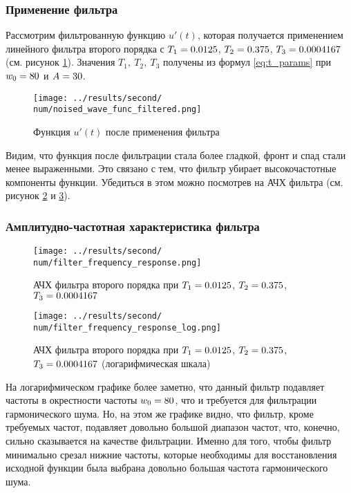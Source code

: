 \FloatBarrier
\subsubsection{Применение фильтра}

Рассмотрим фильтрованную функцию $u'(t)$, которая получается применением линейного фильтра второго порядка с $T_1 = \Tf$, $T_2 = \Ts$, $T_3 = \Tt$ (см. рисунок \ref{fig:noised_wave_func_filtered_\num}).
Значения $T_1,~T_2,~T_3$ получены из формул \eqref{eq:t_params} при $w_0 = 80$ и $A = 30$.

\begin{figure}[ht!]
    \centering
    \texttt{[image: ../results/second/\\num/noised\_wave\_func\_filtered.png]}
    \caption{Функция $u'(t)$ после применения фильтра}
    \label{fig:noised_wave_func_filtered_\num}
\end{figure}

Видим, что функция после фильтрации стала более гладкой, фронт и спад стали менее выраженными.
Это связано с тем, что фильтр убирает высокочастотные компоненты функции. Убедиться в этом можно 
посмотрев на АЧХ фильтра (см. рисунок \ref{fig:filter_frequency_response_\num} и \ref{fig:filter_frequency_response_log_\num}).

\FloatBarrier
\subsubsection{Амплитудно-частотная характеристика фильтра}
\begin{figure}[ht!]
    \centering
    \texttt{[image: ../results/second/\\num/filter\_frequency\_response.png]}
    \caption{АЧХ фильтра второго порядка при $T_1 = \Tf$, $T_2 = \Ts$, $T_3 = \Tt$}
    \label{fig:filter_frequency_response_\num}
\end{figure}

\begin{figure}[ht!]
    \centering
    \texttt{[image: ../results/second/\\num/filter\_frequency\_response\_log.png]}
    \caption{АЧХ фильтра второго порядка при $T_1 = \Tf$, $T_2 = \Ts$, $T_3 = \Tt$ (логарифмическая шкала)}
    \label{fig:filter_frequency_response_log_\num}
\end{figure}

На логарифмическом графике более заметно, что данный фильтр подавляет частоты в окрестности частоты $w_0 = 80$, что и требуется для фильтрации гармонического шума. 
Но, на этом же графике видно, что фильтр, кроме требуемых частот, подавляет довольно большой диапазон частот, что, конечно, сильно сказывается на качестве фильтрации. 
Именно для того, чтобы фильтр минимально срезал нижние частоты, которые необходимы для восстановления исходной функции была выбрана довольно большая частота гармонического шума.

